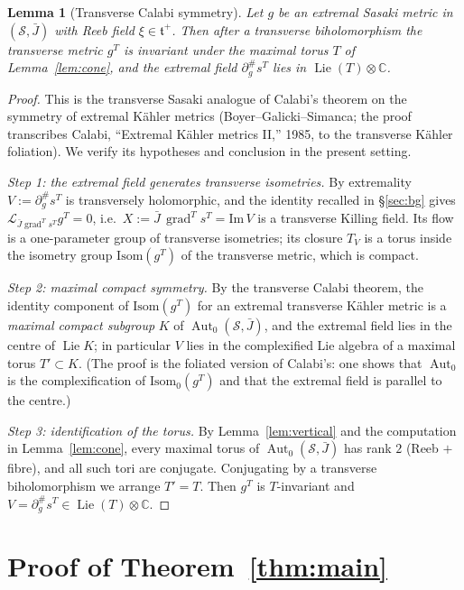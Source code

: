 \documentclass{amsart}
\newtheorem{lemma}{Lemma}
\theoremstyle{definition}
\DeclareMathOperator{\Aut}{Aut}
\DeclareMathOperator{\Lie}{Lie}
\DeclareMathOperator{\grad}{grad}
\begin{document}
\begin{lemma}[Transverse Calabi symmetry]\label{lem:average}
Let $g$ be an extremal Sasaki metric in $(\mathcal S,\bar J)$ with Reeb field
$\xi\in\mathfrak t^+$. Then after a transverse biholomorphism the transverse
metric $g^T$ is invariant under the maximal torus $T$ of Lemma~\ref{lem:cone},
and the extremal field $\partial^\#_g s^T$ lies in
$\Lie(T)\otimes\mathbb C$.
\end{lemma}

\begin{proof}
This is the transverse Sasaki analogue of Calabi's theorem on the symmetry of
extremal K\"ahler metrics (Boyer--Galicki--Simanca; the proof transcribes
Calabi, ``Extremal K\"ahler metrics II,'' 1985, to the transverse K\"ahler
foliation). We verify its hypotheses and conclusion in the present setting.

\emph{Step 1: the extremal field generates transverse isometries.} By
extremality $V:=\partial^\#_g s^T$ is transversely holomorphic, and the
identity recalled in \S\ref{sec:bg} gives $\mathcal L_{\bar
J\grad^T s^T}g^T=0$, i.e.\ $X:=\bar J\,\grad^T s^T=\mathrm{Im}\,V$ is a
transverse Killing field. Its flow is a one-parameter group of transverse
isometries; its closure $T_V$ is a torus inside the isometry group
$\mathrm{Isom}(g^T)$ of the transverse metric, which is compact.

\emph{Step 2: maximal compact symmetry.} By the transverse Calabi theorem, the
identity component of $\mathrm{Isom}(g^T)$ for an extremal transverse K\"ahler
metric is a \emph{maximal compact subgroup} $K$ of $\Aut_0(\mathcal S,\bar J)$,
and the extremal field lies in the centre of $\Lie K$; in particular $V$ lies in
the complexified Lie algebra of a maximal torus $T'\subset K$. (The proof is the
foliated version of Calabi's: one shows that $\Aut_0$ is the complexification of
$\mathrm{Isom}_0(g^T)$ and that the extremal field is parallel to the centre.)

\emph{Step 3: identification of the torus.} By Lemma~\ref{lem:vertical} and the
computation in Lemma~\ref{lem:cone}, every maximal torus of
$\Aut_0(\mathcal S,\bar J)$ has rank $2$ (Reeb $+$ fibre), and all such tori are
conjugate. Conjugating by a transverse biholomorphism we arrange $T'=T$. Then
$g^T$ is $T$-invariant and $V=\partial^\#_g s^T\in\Lie(T)\otimes\mathbb C$.
\end{proof}

\section{Proof of Theorem~\ref{thm:main}}
\end{document}
